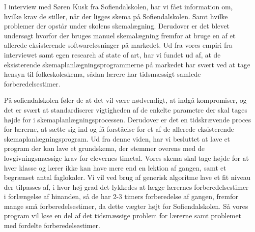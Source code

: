 I interview med Søren Kusk fra Sofiendalskolen, har vi fået information om, hvilke krav de stiller, når der ligges skema på Sofiendalskolen. Samt hvilke problemer der opstår under skolens skemalægning. Derudover er det blevet undersøgt hvorfor der bruges manuel skemalægning fremfor at bruge en af et allerede eksisterende softwareløsninger på markedet.
Ud fra vores empiri fra interviewet samt egen research af state of art, har vi fundet ud af, at de eksisterende skemaplanlægningsprogrammerne på markedet har svært ved at tage hensyn til folkeskoleskema, sådan lærere har tidsmæssigt samlede forberedelsestimer.

På sofiendalskolen føler de at det vil være nødvendigt, at indgå kompromiser, og det er svært at standardiserer vigtigheden af de enkelte parametre der skal tages højde for i skemaplanlægningsprocessen. Derudover er det en tidskrævende proces for lærerne, at sætte sig ind og få forståelse for et af de allerede eksisterende skemaplanlægningsprogram.
Ud fra denne viden, har vi besluttet at lave et program der kan lave et grundskema, der stemmer overens med de lovgivningsmæssige krav for elevernes timetal. Vores skema skal tage højde for at hver klasse og lærer ikke kan have mere end en lektion af gangen, samt et begrænset antal faglokaler. Vi vil ved brug af generisk algoritme lave et fit niveau der tilpasses af, i hvor høj grad det lykkedes at lægge lærernes forberedelsestimer i forlængelse af hinanden, så de har 2-3 timers forberedelse af gangen, fremfor mange små forberedelsestimer, da dette vægter højt for Sofiendalskolen.
Så vores program vil løse en del af det tidsmæssige problem for lærerne samt problemet med fordelte forberedelsestimer.